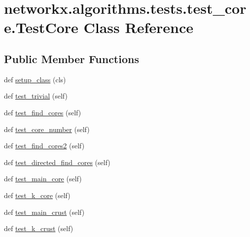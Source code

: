 \hypertarget{classnetworkx_1_1algorithms_1_1tests_1_1test__core_1_1TestCore}{}\section{networkx.\+algorithms.\+tests.\+test\+\_\+core.\+Test\+Core Class Reference}
\label{classnetworkx_1_1algorithms_1_1tests_1_1test__core_1_1TestCore}
\subsection*{Public Member Functions}
\begin{DoxyCompactItemize}
\item 
def \hyperlink{classnetworkx_1_1algorithms_1_1tests_1_1test__core_1_1TestCore_a9711bce44e66a7c50eb874622a6d1328}{setup\+\_\+class} (cls)
\item 
def \hyperlink{classnetworkx_1_1algorithms_1_1tests_1_1test__core_1_1TestCore_a10f93b4398dce1251a5a4e4863ceedb0}{test\+\_\+trivial} (self)
\item 
def \hyperlink{classnetworkx_1_1algorithms_1_1tests_1_1test__core_1_1TestCore_a0c02e69c1b886e13bbc8c62b289d4409}{test\+\_\+find\+\_\+cores} (self)
\item 
def \hyperlink{classnetworkx_1_1algorithms_1_1tests_1_1test__core_1_1TestCore_aa69954b62a371d137c7621a234c86a76}{test\+\_\+core\+\_\+number} (self)
\item 
def \hyperlink{classnetworkx_1_1algorithms_1_1tests_1_1test__core_1_1TestCore_a547dd85c47d6c135597eee4b5fb1505c}{test\+\_\+find\+\_\+cores2} (self)
\item 
def \hyperlink{classnetworkx_1_1algorithms_1_1tests_1_1test__core_1_1TestCore_ada7cb1f85ab5d83f79a10ba4ad48b85f}{test\+\_\+directed\+\_\+find\+\_\+cores} (self)
\item 
def \hyperlink{classnetworkx_1_1algorithms_1_1tests_1_1test__core_1_1TestCore_a71593c768fcb0763762cbf64c25b9e40}{test\+\_\+main\+\_\+core} (self)
\item 
def \hyperlink{classnetworkx_1_1algorithms_1_1tests_1_1test__core_1_1TestCore_a49c5cd158b8d7f2fbafd1ff497cf6b78}{test\+\_\+k\+\_\+core} (self)
\item 
def \hyperlink{classnetworkx_1_1algorithms_1_1tests_1_1test__core_1_1TestCore_aefcce5590b0effcf1f8f1d5e8581eed8}{test\+\_\+main\+\_\+crust} (self)
\item 
def \hyperlink{classnetworkx_1_1algorithms_1_1tests_1_1test__core_1_1TestCore_a8557b516153c17acf2887fd65686962e}{test\+\_\+k\+\_\+crust} (self)

\end{DoxyCompactItemize}
